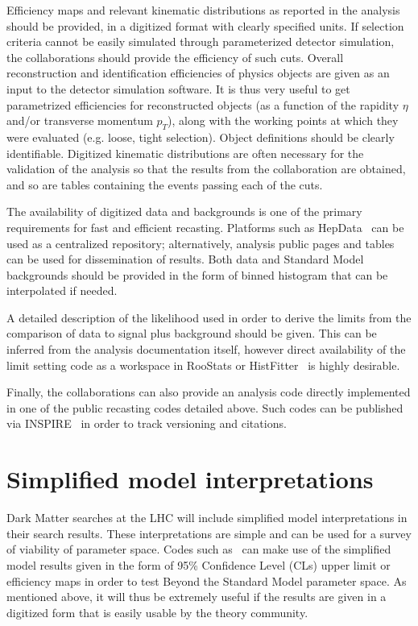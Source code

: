 Efficiency maps and relevant kinematic distributions as reported in the analysis should be provided, in a digitized format with clearly specified units.
If selection criteria cannot be easily simulated through parameterized detector simulation, the collaborations should provide the efficiency of such cuts. 
Overall reconstruction and identification efficiencies of physics objects are given as an input to the detector simulation software. 
It is thus very useful to get parametrized efficiencies for reconstructed objects (as a function of the rapidity $\eta$ and/or transverse momentum $p_T$), 
along with the working points at which they were evaluated (e.g. loose, tight selection). Object definitions should be clearly identifiable. 
Digitized kinematic distributions are often necessary for the validation of the analysis so that the results from the collaboration are obtained, 
and so are tables containing the events passing each of the cuts. 

The availability of digitized data and backgrounds is one of the primary requirements for fast and efficient recasting. 
Platforms such as HepData~\cite{HEPData} can be used as a centralized repository; alternatively, analysis public pages and tables can be used
for dissemination of results. Both data and Standard Model backgrounds should be provided in the form of binned histogram that can be interpolated if needed. 

A detailed description of the likelihood used in order to derive the limits from the comparison of data to signal plus background should be given. 
This can be inferred from the analysis documentation itself, however direct availability of the limit setting code as a workspace in RooStats or HistFitter~\cite{Baak:2014wma} is highly desirable. 

Finally, the collaborations can also provide an analysis code directly implemented in one of the public recasting codes detailed above. 
Such codes can be published via INSPIRE~\cite{INSPIRE} in order to track versioning and citations. 

\section{Simplified model interpretations}

Dark Matter searches at the LHC will include simplified model interpretations in their search results. These interpretations are simple and can be used for a survey of viability of parameter space. Codes such as~\cite{Kraml:2013mwa, Kraml:2014sna, Papucci:2014rja} can make use of the simplified model results given in the form of 95\% Confidence Level (CLs) upper limit  or efficiency maps in order to test Beyond the Standard Model parameter space. As mentioned above, it will thus be extremely useful if the results are given in a digitized form that is easily usable by the theory community. 

